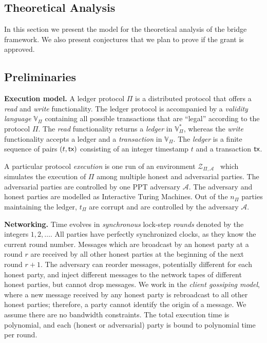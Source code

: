 \subsection{Theoretical Analysis}
In this section we present the model for the theoretical analysis of the bridge framework. 
We also present conjectures that we plan to prove if the grant is approved.
\subsection{Preliminaries}
\noindent
\textbf{Execution model.}
A ledger protocol $\Pi$ is a distributed protocol that offers
a \emph{read} and \emph{write} functionality.
The ledger protocol is accompanied by a \emph{validity language}
$\mathbb{V}_{\Pi}$ containing all possible transactions that are ``legal''
according to the protocol $\Pi$.
The
\emph{read} functionality returns a \emph{ledger} in $\mathbb{V}_{\Pi}^*$,
whereas the \emph{write} functionality accepts a ledger and a \emph{transaction} in $\mathbb{V}_\Pi$.
The \emph{ledger} is a finite sequence of pairs $(t, \textsf{tx})$ consisting
of an integer timestamp $t$ and a transaction $\textsf{tx}$.

A particular protocol \emph{execution}
is one run of an environment $\mathcal{Z}_{\Pi,\mathcal{A}}$~\cite{FOCS:Canetti01} which simulates
the execution of $\Pi$ among multiple honest and adversarial parties. The adversarial
parties are controlled by one PPT adversary $\mathcal{A}$. The adversary and honest
parties are modelled as Interactive Turing Machines.
Out of the
$n_\Pi$ parties maintaining the ledger, $t_\Pi$ are corrupt and are controlled by the adversary
$\mathcal{A}$.

\noindent
\textbf{Networking.}
Time evolves in \emph{synchronous} lock-step \emph{rounds} denoted by the integers $1, 2,
\ldots$. All parties have perfectly synchronized clocks, as they know the current round number.
Messages which are broadcast by an honest party at a round $r$ are received by all
other honest parties at the beginning of the next round $r + 1$. The adversary
can reorder messages, potentially different for each honest party, and
inject different messages to the network tapes of different honest parties,
but cannot drop messages. We work in the \emph{client gossiping model}, where
a new message received by any honest party is rebroadcast to all other honest
parties; therefore, a party cannot identify the origin of a message. We assume there are no bandwidth constraints.
The total execution time is polynomial, and each (honest or adversarial)
party is bound to polynomial time per round.

